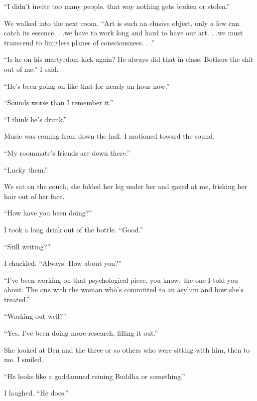 ``I didn't invite too many people, that way nothing gets broken or
stolen.''

We walked into the next room. ``Art is such an elusive object, only a
few can catch its essence. . .we have to work long and hard to have our
art. . .we must transcend to limitless planes of consciousness. . .''

``Is he on his martyrdom kick again? He always did that in class.
Bothers the shit out of me.'' I said.

``He's been going on like that for nearly an hour now.''

``Sounds worse than I remember it.''

``I think he's drunk.''

Music was coming from down the hall. I motioned toward the sound.

``My roommate's friends are down there.''

``Lucky them.''

We sat on the couch, she folded her leg under her and gazed at me,
frisking her hair out of her face.

``How have you been doing?''

I took a long drink out of the bottle. ``Good.''

``Still writing?''

I chuckled. ``Always. How about you?''

``I've been working on that psychological piece, you know, the one I
told you about. The one with the woman who's committed to an asylum and
how she's treated.''

``Working out well?''

``Yes. I've been doing more research, filling it out.''

She looked at Ben and the three or so others who were sitting with him,
then to me. I smiled.

``He looks like a goddamned reining Buddha or something.''

I laughed. ``He does.''

